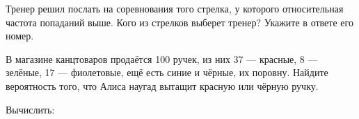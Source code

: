 \begin{class}[number=4]
\begin{listofex}
		Тренер решил послать на соревнования того стрелка, у которого относительная частота попаданий выше. Кого из стрелков выберет тренер? Укажите в ответе его номер.
		\item В магазине канцтоваров продаётся 100 ручек, из них 37 --- красные, 8 --- зелёные, 17 --- фиолетовые, ещё есть синие и чёрные, их поровну. Найдите вероятность того, что Алиса наугад вытащит красную или чёрную ручку.
		\item Вычислить:
		\begin{enumcols}[itemcolumns=3]
			\item {}
			\item {}
			\item {}
		\end{enumcols}
		\item {}
	\end{listofex}
\end{class}
%
%
%
%
%
%	
%
%
%	
%
%
%
%	
%
%
%	
